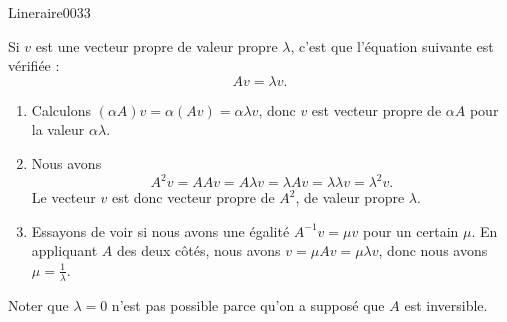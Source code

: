 \begin{corrige}{Lineraire0033}

	Si $v$ est une vecteur propre de valeur propre $\lambda$, c'est que l'équation suivante est vérifiée :
	\begin{equation}
		Av=\lambda v.
	\end{equation}
	\begin{enumerate}

		\item
			Calculons $(\alpha A)v=\alpha(Av)=\alpha\lambda v$, donc $v$ est vecteur propre de $\alpha A$ pour la valeur $\alpha\lambda$.

		\item
			Nous avons
			\begin{equation}
				A^2v=AAv=A\lambda v=\lambda Av=\lambda\lambda v=\lambda^2v.
			\end{equation}
			Le vecteur $v$ est donc vecteur propre de $A^2$, de valeur propre $\lambda$.

		\item Essayons de voir si nous avons une égalité $A^{-1}v=\mu v$ pour un certain $\mu$. En appliquant $A$ des deux côtés, nous avons $v=\mu Av=\mu\lambda v$, donc nous avons $\mu=\frac{1}{ \lambda }$.

	\end{enumerate}
	Noter que $\lambda=0$ n'est pas possible parce qu'on a supposé que $A$ est inversible.

\end{corrige}

